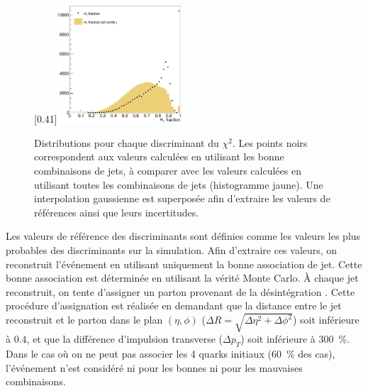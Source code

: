 \begin{figure}[p]
    [0.41\textwidth]{\includegraphics[width=0.41\textwidth]{chapitre6/figs/chi2/chi2_discrimant_combinations_ht_frac.pdf}}
    \caption{Distributions pour chaque discriminant du $\chi^2$. Les points noirs correspondent aux valeurs calculées en utilisant les bonne combinaisons de jets, à comparer avec les valeurs calculées en utilisant toutes les combinaisons de jets (histogramme jaune). Une interpolation gaussienne est superposée afin d'extraire les valeurs de références ainsi que leurs incertitudes.}
    \label{fig:chi2_distributions}
\end{figure}

Les valeurs de référence des discriminants sont définies comme les valeurs les plus probables des discriminants sur la simulation. Afin d'extraire ces valeurs, on reconstruit l'événement \ttbar en utilisant uniquement la bonne association de jet. Cette bonne association est déterminée en utilisant la vérité Monte Carlo. À chaque jet reconstruit, on tente d'assigner un parton provenant de la désintégration \ttbar. Cette procédure d'assignation est réalisée en demandant que la distance entre le jet reconstruit et le parton dans le plan $(\eta, \phi)$ ($\Delta R = \sqrt{\Delta \eta^2 + \Delta \phi^2}$) soit inférieure à $0.4$, et que la différence d'impulsion transverse ($\Delta p_T$) soit inférieure à \SI{300}{\%}. Dans le cas où on ne peut pas associer les 4 quarks initiaux (\tilde \SI{60}{\%} des cas), l'événement n'est considéré ni pour les bonnes ni pour les mauvaises combinaisons.

